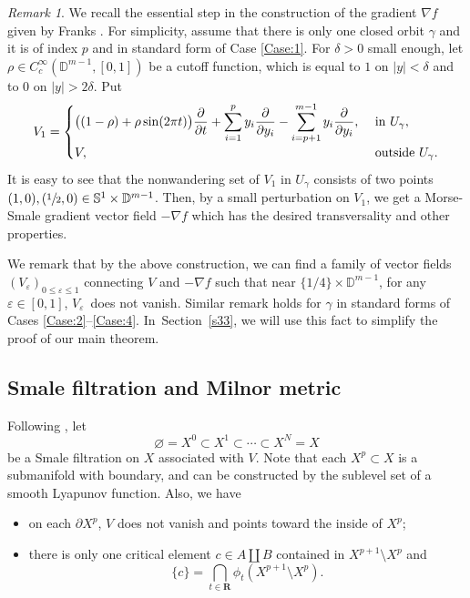 \documentclass[JEP,XML,SOM,Unicode]{cedram}
\theoremstyle{plain}
\theoremstyle{definition}
\theoremstyle{remark}
\newtheorem{re}[lem]{Remark}
\newcommand{\bR}{\mathbf{R}}
\newcommand{\bbD}{\mathbb{D}}
\newcommand{\bbS}{\mathbb{S}}
\let\p\partial
\let\l\leqslant
\let\e\varepsilon
\begin{document}
\begin{re}\label{reK}We recall the essential step in the
construction of the gradient $\nabla f$ given by Franks \cite[Prop.\,8.5]{Franks1982}. For simplicity, assume that there is only one
closed orbit $\gamma$ and it is of index $p$ and in standard
form of Case \ref{Case:1}.
For $\delta>0$ small enough, let $\rho\in
C^{\infty}_{c}(\bbD^{m-1},[0,1])$
be a cutoff function, which is equal to
$1$ on $|y|<\delta$ and to $0$ on $|y|>2\delta$. Put
\begin{equation*}
V_{1}=
\begin{cases}
\displaystyle
\big((1-\rho)+\rho\sin(2\pi t)\big)\frac{\p}{\p t}+\sum_{i=1}^{p}y_{i}\frac{\p}{\p
y_{i}}-\sum_{i=p+1}^{m-1}y_{i}\frac{\p}{\p y_{i}}, &\hbox{ in
} U_{\gamma},\\
V,& \hbox{ outside } U_{\gamma}.
\end{cases}
\end{equation*}
It is easy to see that the
nonwandering set of $V_{1}$ in $U_{\gamma}$ consists of two
points $(1,0),(\sfrac{1}{2},0)\in
\bbS^{1}\times \bbD^{m-1}$. Then, by a small perturbation on $V_{1}$, we get a Morse-Smale gradient vector
field $-\nabla f$ which
has the desired transversality and other properties.

We remark that by the above construction, we can find a family of vector fields $(V_{\e})_{0\l\e\l1}$ connecting $V$ and
$-\nabla f$ such that near $\{1/4\}\times \bbD^{m-1}$, for
any $ \e\in [0,1]$, $V_{\e}$~does not vanish.
Similar remark holds for $\gamma$ in standard forms of Cases \ref{Case:2}--\ref{Case:4}.
In~Section~\ref{s33}, we will use this fact to simplify the proof of our main theorem.
\end{re}

\subsection{Smale filtration and Milnor metric}\label{sSF}
Following \cite[Def.\,9.10]{Franks1982},
let
\begin{equation}\label{eqSmale}
\varnothing=X^{0}\subset X^{1}\subset\cdots \subset X^{N}=X
\end{equation}
be a Smale filtration on $X$ associated with $V$. Note that each
$X^{p}\subset X$ is a submanifold with boundary, and can be constructed by the sublevel set of a smooth Lyapunov function. Also, we
have
\begin{itemize}
\item on each $\p X^{p}$, $V$ does not vanish and points toward the inside of $X^{p}$;
\item there is only one critical element $c\in A\coprod
B$ contained in $X^{p+1}\setminus
X^{p}$ and
\begin{equation*}
\{c\}=\bigcap_{t\in \bR}\phi_{t}(X^{p+1}\setminus
X^{p}).
\end{equation*}
\end{itemize}
\end{document}
